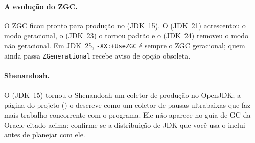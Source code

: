 \paragraph{A evolução do ZGC.}
O ZGC ficou pronto para produção no  (JDK~15).
O  (JDK~21) acrescentou o modo geracional, o
 (JDK~23) o tornou padrão e o
 (JDK~24) removeu o modo não geracional. Em JDK~25,
\texttt{-XX:+UseZGC} é sempre o ZGC geracional; quem ainda passa
\texttt{ZGenerational} recebe aviso de opção obsoleta.

\paragraph{Shenandoah.}
O  (JDK~15) tornou o Shenandoah um coletor de
produção no OpenJDK; a página do projeto () o
descreve como um coletor de pausas ultrabaixas que faz mais trabalho
concorrente com o programa. Ele não aparece no guia de GC da Oracle
citado acima: confirme se a distribuição de JDK que você usa o inclui
antes de planejar com ele.

